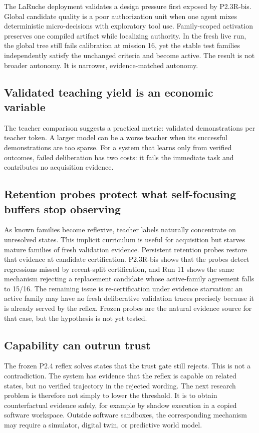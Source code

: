 \documentclass[10pt]{article}
\begin{document}
The LaRuche deployment validates a design pressure first exposed by P2.3R-bis. Global candidate quality is a poor authorization unit when one agent mixes deterministic micro-decisions with exploratory tool use. Family-scoped activation preserves one compiled artifact while localizing authority. In the fresh live run, the global tree still fails calibration at mission 16, yet the stable test families independently satisfy the unchanged criteria and become active. The result is not broader autonomy. It is narrower, evidence-matched autonomy.

\subsection{Validated teaching yield is an economic variable}

The teacher comparison suggests a practical metric: validated demonstrations per teacher token. A larger model can be a worse teacher when its successful demonstrations are too sparse. For a system that learns only from verified outcomes, failed deliberation has two costs: it fails the immediate task and contributes no acquisition evidence.

\subsection{Retention probes protect what self-focusing buffers stop observing}

As known families become reflexive, teacher labels naturally concentrate on unresolved states. This implicit curriculum is useful for acquisition but starves mature families of fresh validation evidence. Persistent retention probes restore that evidence at candidate certification. P2.3R-bis shows that the probes detect regressions missed by recent-split certification, and Run 11 shows the same mechanism rejecting a replacement candidate whose active-family agreement falls to 15/16. The remaining issue is re-certification under evidence starvation: an active family may have no fresh deliberative validation traces precisely because it is already served by the reflex. Frozen probes are the natural evidence source for that case, but the hypothesis is not yet tested.

\subsection{Capability can outrun trust}

The frozen P2.4 reflex solves states that the trust gate still rejects. This is not a contradiction. The system has evidence that the reflex is capable on related states, but no verified trajectory in the rejected wording. The next research problem is therefore not simply to lower the threshold. It is to obtain counterfactual evidence safely, for example by shadow execution in a copied software workspace. Outside software sandboxes, the corresponding mechanism may require a simulator, digital twin, or predictive world model.
\end{document}
